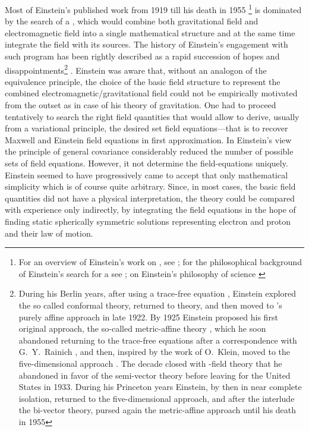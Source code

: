 \documentclass[draft]{article}
\newcommand{\FP}{\german{Fernparallelismus}\xspace}
\begin{document}
Most of Einstein's published work from 1919 till his death in 1955 \citep{Einstein1955-07}\footnote{For an overview of Einstein's work on \uftp, see \citet{Sauer2014}; for the philosophical background of Einstein's search for a \uft see \citet{Dongen2010}; on Einstein's philosophy of science \citet{Ryckman2017}} is dominated by the search of a \uft, which would combine both gravitational field and electromagnetic field into a single mathematical structure and at the same time integrate the field with its sources. The history of Einstein's engagement with such program has been rightly described as a rapid succession of hopes and disappointments\footnote{During his Berlin years, after using a trace-free equation \citep{Einstein1919}, Einstein explored the so called conformal theory, returned to  theory, \citep{Einstein1921?} and then moved to \citep{Eddington1921}'s purely affine approach \citep{Einstein1923c,Einstein1923d,Einstein1923e} in late 1922. By 1925 Einstein proposed his first original approach, the so-called metric-affine theory \citep{Einstein1925a}, which he soon abandoned returning to the trace-free equations after a correspondence with G.~Y.~Rainich \citep{Einstein1927c}, and then, inspired by the work of O.~Klein, moved to the five-dimensional approach \citep{Einstein19271,Einstein19272}. The decade closed with \FP-field theory that he abandoned in favor of the semi-vector theory before leaving for the United States in 1933. During his Princeton years Einstein, by then in near complete isolation, returned to the five-dimensional approach, and after the interlude the bi-vector theory, pursed again the metric-affine approach until his death in 1955} \citep[187]{Vizgin1994}. Einstein was aware that, without an analogon of the equivalence principle, the choice of the basic field structure to represent the combined electromagnetic/gravitational field could not be empirically motivated from the outset as in case of his theory of gravitation. One had to proceed tentatively to search the right field quantities that would allow to derive, usually from a variational principle, the desired set field equations---that is to recover Maxwell and Einstein field equations in first approximation. In Einstein's view the principle of general covariance considerably reduced the number of possible sets of field equations. However, it not determine the field-equations uniquely. Einstein seemed to have progressively came to accept that only mathematical simplicity which is of course quite arbitrary. Since, in most cases, the basic field quantities did not have a physical interpretation, the theory could be compared with experience only indirectly, by integrating the field equations in the hope of finding static spherically symmetric solutions representing electron and proton and their law of motion. 
\end{document}

